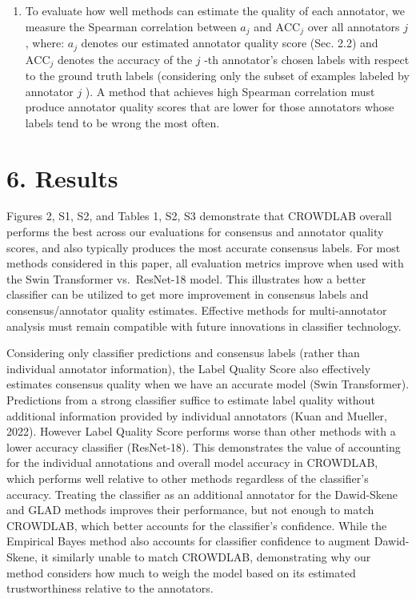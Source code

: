\documentclass[
]{article}
\providecommand{\tightlist}{%
  \setlength{\itemsep}{0pt}\setlength{\parskip}{0pt}}
\begin{document}
\begin{enumerate}
\def\labelenumi{\arabic{enumi}.}
\setcounter{enumi}{2}
\tightlist
\item
  To evaluate how well methods can estimate the quality of each
  annotator, we measure the Spearman correlation between \(a_j\) and
  \(\mathrm{ACC}_j\) over all annotators \(j\) , where: \(a_j\) denotes
  our estimated annotator quality score (Sec. 2.2) and
  \(\mathrm{ACC}_j\) denotes the accuracy of the \(j\) -th annotator's
  chosen labels with respect to the ground truth labels (considering
  only the subset of examples labeled by annotator \(j\) ). A method
  that achieves high Spearman correlation must produce annotator quality
  scores that are lower for those annotators whose labels tend to be
  wrong the most often.
\end{enumerate}

\section{6. Results}\label{results}

Figures 2, S1, S2, and Tables 1, S2, S3 demonstrate that CROWDLAB
overall performs the best across our evaluations for consensus and
annotator quality scores, and also typically produces the most accurate
consensus labels. For most methods considered in this paper, all
evaluation metrics improve when used with the Swin Transformer
vs.~ResNet-18 model. This illustrates how a better classifier can be
utilized to get more improvement in consensus labels and
consensus/annotator quality estimates. Effective methods for
multi-annotator analysis must remain compatible with future innovations
in classifier technology.

Considering only classifier predictions and consensus labels (rather
than individual annotator information), the Label Quality Score also
effectively estimates consensus quality when we have an accurate model
(Swin Transformer). Predictions from a strong classifier suffice to
estimate label quality without additional information provided by
individual annotators (Kuan and Mueller, 2022). However Label Quality
Score performs worse than other methods with a lower accuracy classifier
(ResNet-18). This demonstrates the value of accounting for the
individual annotations and overall model accuracy in CROWDLAB, which
performs well relative to other methods regardless of the classifier's
accuracy. Treating the classifier as an additional annotator for the
Dawid-Skene and GLAD methods improves their performance, but not enough
to match CROWDLAB, which better accounts for the classifier's
confidence. While the Empirical Bayes method also accounts for
classifier confidence to augment Dawid-Skene, it similarly unable to
match CROWDLAB, demonstrating why our method considers how much to weigh
the model based on its estimated trustworthiness relative to the
annotators.
\end{document}
